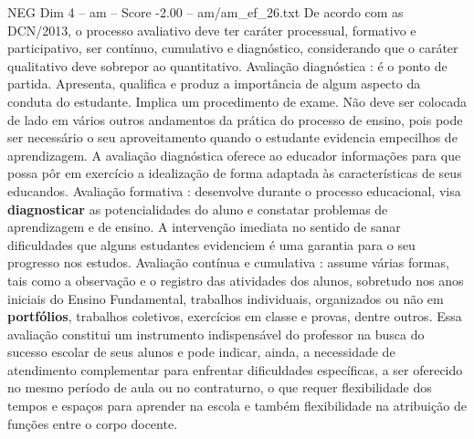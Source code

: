 \begin{textsample}{NEG Dim 4 – am – Score -2.00 – am/am\_ef\_26.txt}
De acordo com as DCN/2013, o processo avaliativo deve ter caráter processual, formativo e participativo, ser contínuo, cumulativo e diagnóstico, considerando que o caráter qualitativo deve sobrepor ao quantitativo.
Avaliação diagnóstica : é o ponto de partida.
Apresenta, qualifica e produz a importância de algum aspecto da conduta do estudante.
Implica um procedimento de exame.
Não deve ser colocada de lado em vários outros andamentos da prática do processo de ensino, pois pode ser necessário o seu aproveitamento quando o estudante evidencia empecilhos de aprendizagem.
A avaliação diagnóstica oferece ao educador informações para que possa pôr em exercício a idealização de forma adaptada às características de seus educandos.
Avaliação formativa : desenvolve durante o processo educacional, visa \textbf{diagnosticar} as potencialidades do aluno e constatar problemas de aprendizagem e de ensino.
A intervenção imediata no sentido de sanar dificuldades que alguns estudantes evidenciem é uma garantia para o seu progresso nos estudos.
Avaliação contínua e cumulativa : assume várias formas, tais como a observação e o registro das atividades dos alunos, sobretudo nos anos iniciais do Ensino Fundamental, trabalhos individuais, organizados ou não em \textbf{portfólios}, trabalhos coletivos, exercícios em classe e provas, dentre outros.
Essa avaliação constitui um instrumento indispensável do professor na busca do sucesso escolar de seus alunos e pode indicar, ainda, a necessidade de atendimento complementar para enfrentar dificuldades específicas, a ser oferecido no mesmo período de aula ou no contraturno, o que requer flexibilidade dos tempos e espaços para aprender na escola e também flexibilidade na atribuição de funções entre o corpo docente.

\end{textsample}
